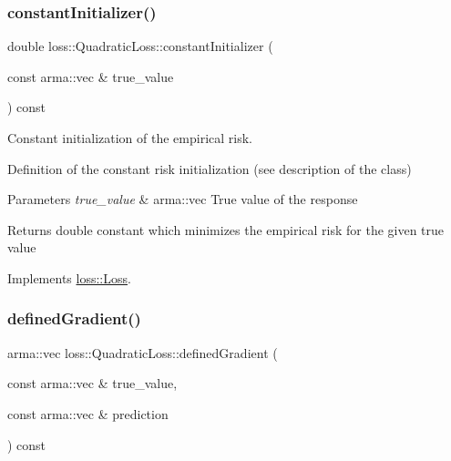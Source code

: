 \subsubsection{\texorpdfstring{constant\+Initializer()}{constantInitializer()}}
{\footnotesize\ttfamily double loss\+::\+Quadratic\+Loss\+::constant\+Initializer (\begin{DoxyParamCaption}\item[{const arma\+::vec \&}]{true\+\_\+value }\end{DoxyParamCaption}) const\hspace{0.3cm}{\ttfamily [virtual]}}



Constant initialization of the empirical risk. 

Definition of the constant risk initialization (see description of the class)


\begin{DoxyParams}{Parameters}
{\em true\+\_\+value} & {\ttfamily arma\+::vec} True value of the response\\
\hline
\end{DoxyParams}
\begin{DoxyReturn}{Returns}
{\ttfamily double} constant which minimizes the empirical risk for the given true value 
\end{DoxyReturn}


Implements \mbox{\hyperlink{classloss_1_1_loss_a65fe7dcd9370e6a549b8d1cc95fc8798}{loss\+::\+Loss}}.

\mbox{\label{classloss_1_1_quadratic_loss_adb4da1acbad702b5ba8570abaa17d373}} 
\subsubsection{\texorpdfstring{defined\+Gradient()}{definedGradient()}}
{\footnotesize\ttfamily arma\+::vec loss\+::\+Quadratic\+Loss\+::defined\+Gradient (\begin{DoxyParamCaption}\item[{const arma\+::vec \&}]{true\+\_\+value,  }\item[{const arma\+::vec \&}]{prediction }\end{DoxyParamCaption}) const\hspace{0.3cm}{\ttfamily [virtual]}}



